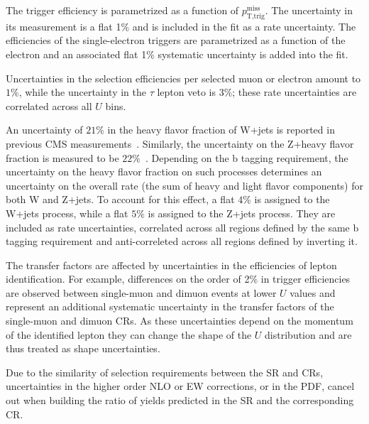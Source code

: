 The \ptmiss trigger efficiency is parametrized as a function of $p_\text{T,trig}^\text{miss}$. The uncertainty in its measurement is a flat 1\% and is included in the fit as a rate uncertainty.
The efficiencies of the single-electron triggers are parametrized as a
function of the electron \pt and an associated flat 1\% systematic uncertainty is added into the fit.

Uncertainties in the selection efficiencies per selected muon or electron amount to $1\%$, while the uncertainty in the $\tau$ lepton veto is $3\%$; these rate uncertainties are correlated across all $U$ bins.

An uncertainty of $21\%$ in the heavy flavor fraction of
W+jets is reported in previous CMS measurements~\cite{Khachatryan:2014uva,Chatrchyan:2013uza}. Similarly, the uncertainty on the Z+heavy flavor fraction is measured to be $22\%$~\cite{Khachatryan:2014zya,Chatrchyan:2014dha}. Depending on the b tagging requirement, the uncertainty on the heavy flavor fraction on such processes determines an uncertainty on the overall rate (the sum of heavy and light flavor components) for both W and Z+jets. To account for this effect, a flat $4\%$ is assigned to the W+jets process, while a flat $5\%$ is assigned to the Z+jets process. They are included as rate uncertainties, correlated across all regions defined by the same b tagging requirement and anti-correleted across all regions defined by inverting it.
%
%

The transfer factors are affected by uncertainties in the efficiencies
of lepton identification.  For example, differences on the order of
2\% in \MET trigger efficiencies are observed between single-muon and
dimuon events at lower $U$ values and represent an additional
systematic uncertainty in the transfer factors of the single-muon and
dimuon CRs. As these uncertainties depend on the momentum of the
identified lepton they can change the shape of the $U$ distribution
and are thus treated as shape uncertainties.

Due to the similarity of selection requirements between the SR and CRs, uncertainties in the higher order NLO or EW corrections, or in the PDF, cancel out when building the ratio of yields predicted in the SR and the corresponding CR.

